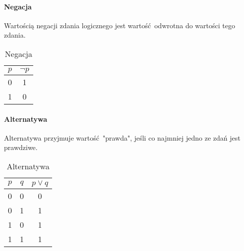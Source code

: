        \paragraph{Negacja}
        Wartością negacji zdania logicznego jest wartość odwrotna do wartości tego zdania.
        \begin{table}[h!]
            \begin{center}
                \caption{Negacja}
                \label{tab:tabela1}
                \begin{tabular}{c|c}
                    \textbf{$p$} & \textbf{$\neg p$} \\
                    \midrule
                    0 & 1\\
                    1 & 0 \\
                    \bottomrule
                \end{tabular}
            \end{center}
        \end{table}

        \paragraph{Alternatywa}
        Alternatywa przyjmuje wartość "prawda", jeśli co najmniej jedno ze zdań jest prawdziwe.
        \begin{table}[h!]
            \begin{center}
                \caption{Alternatywa}
                \label{tab:tabela2}
                \begin{tabular}{c|c|c}
                    \textbf{$p$} & \textbf{$q$} & \textbf{$p \vee q$} \\
                    \midrule
                    0 & 0 & 0\\
                    0 & 1 & 1\\
                    1 & 0 & 1\\
                    1 & 1 & 1\\
                    \bottomrule
                \end{tabular}
            \end{center}
        \end{table}

